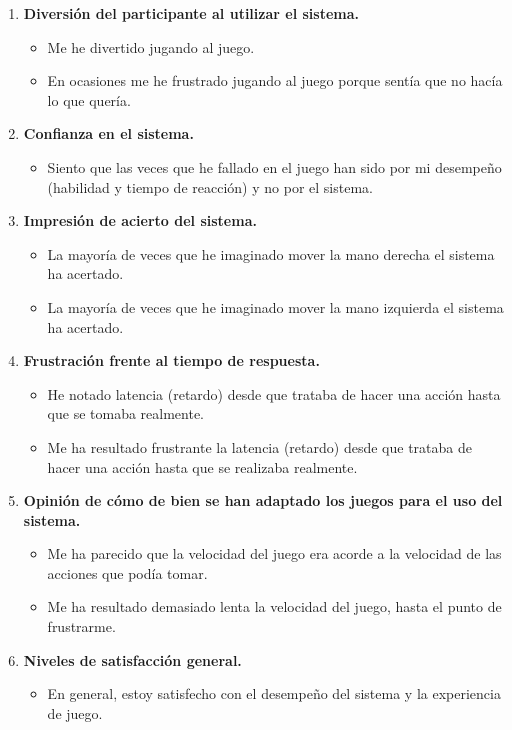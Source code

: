 \begin{enumerate}
      \item \textbf{Diversión del participante al utilizar el sistema.}
            \begin{itemize}
                  \item Me he divertido jugando al juego.
                  \item En ocasiones me he frustrado jugando al juego porque sentía que no hacía lo que
                        quería.
            \end{itemize}
      \item \textbf{Confianza en el sistema.}
            \begin{itemize}
                  \item Siento que las veces que he fallado en el juego han sido por mi desempeño
                        (habilidad y tiempo de reacción) y no por el sistema.
            \end{itemize}
      \item \textbf{Impresión de acierto del sistema.}
            \begin{itemize}
                  \item La mayoría de veces que he imaginado mover la mano derecha el sistema ha
                        acertado.
                  \item La mayoría de veces que he imaginado mover la mano izquierda el sistema ha
                        acertado.
            \end{itemize}
      \item \textbf{Frustración frente al tiempo de respuesta.}
            \begin{itemize}
                  \item He notado latencia (retardo) desde que trataba de hacer una acción hasta que se
                        tomaba realmente.
                  \item Me ha resultado frustrante la latencia (retardo) desde que trataba de hacer una
                        acción hasta que se realizaba realmente.
            \end{itemize}
      \item \textbf{Opinión de cómo de bien se han adaptado los juegos para el uso del sistema.}
            \begin{itemize}
                  \item Me ha parecido que la velocidad del juego era acorde a la velocidad de las
                        acciones que podía tomar.
                  \item Me ha resultado demasiado lenta la velocidad del juego, hasta el punto de
                        frustrarme.
            \end{itemize}
      \item \textbf{Niveles de satisfacción general.}
            \begin{itemize}
                  \item En general, estoy satisfecho con el desempeño del sistema y la experiencia de
                        juego.
            \end{itemize}
\end{enumerate}

